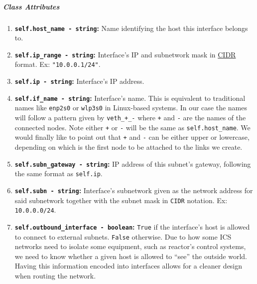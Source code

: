         \subparagraph{Class Attributes}
            \begin{enumerate}
                \item \textbf{\texttt{self.host\_name - string}:} Name identifying the host this interface belongs to.
                \item \textbf{\texttt{self.ip\_range - string}:} Interface's IP and subnetwork mask in \href{https://en.wikipedia.org/wiki/Classless_Inter-Domain_Routing}{CIDR} format. Ex: \texttt{"10.0.0.1/24"}.
                \item \textbf{\texttt{self.ip - string}:} Interface's IP address.
                \item \textbf{\texttt{self.if\_name - string}:} Interface's name. This is equivalent to traditional names like \texttt{enp2s0} or \texttt{wlp3s0} in Linux-based systems. In our case the names will follow a pattern given by \texttt{veth\_+\_-} where \texttt{+} and \texttt{-} are the names of the connected nodes. Note either \texttt{+} or \texttt{-} will be the same as \texttt{self.host\_name}. We would finally like to point out that \texttt{+} and \texttt{-} can be either upper or lowercase, depending on which is the first node to be attached to the links we create.
                \item \textbf{\texttt{self.subn\_gateway - string}:} IP address of this subnet's gateway, following the same format as \texttt{self.ip}.
                \item \textbf{\texttt{self.subn - string}:} Interface's subnetwork given as the network address for said subnetwork together with the subnet mask in \texttt{CIDR} notation. Ex: \texttt{10.0.0.0/24}.
                \item \textbf{\texttt{self.outbound\_interface - boolean}:} \texttt{True} if the interface's host is allowed to connect to external subnets. \texttt{False} otherwise. Due to how some ICS networks need to isolate some equipment, such as reactor's control systems, we need to know whether a given host is allowed to ``see'' the outside world. Having this information encoded into interfaces allows for a cleaner design when routing the network.
            \end{enumerate}


